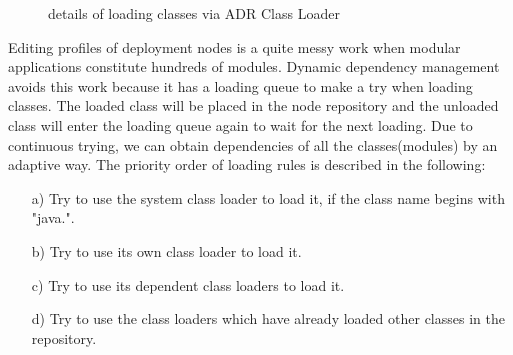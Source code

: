 \documentclass[conference]{IEEEtran}
\begin{document}
\begin{figure}[!t]
\centering
{}
\hfil
{}
\hfil
{}
\caption{details of loading classes via ADR Class Loader}
\label{fig:loading_queue}
\end{figure}

Editing profiles of deployment nodes is a quite messy work when modular applications constitute hundreds of modules.
Dynamic dependency management avoids this work because it has a loading queue to make a try when loading classes.
The loaded class will be placed in the node repository and the unloaded class will enter the loading queue again to wait for the next loading.
Due to continuous trying, we can obtain dependencies of all the classes(modules) by an adaptive way.
The priority order of loading rules is described in the following:
\begin{itemize}[]
\item[a)] Try to use the system class loader to load it, if the class name begins with "java.".
\item[b)] Try to use its own class loader to load it.
\item[c)] Try to use its dependent class loaders to load it.
\item[d)] Try to use the class loaders which have already loaded other classes in the repository. 
\end{itemize}
\end{document}
